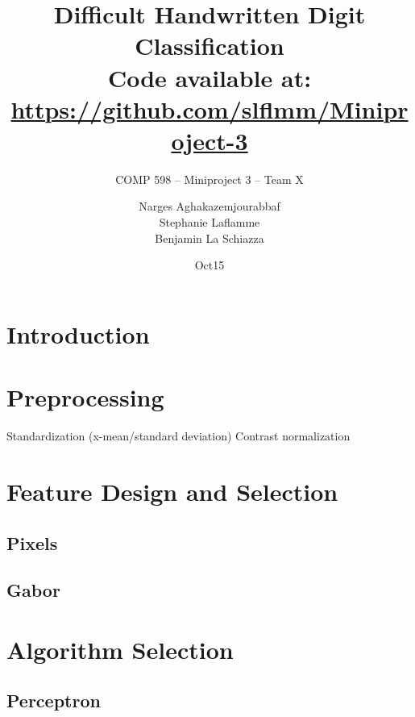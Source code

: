 \documentclass{acm_proc_article-sp}
\begin{document}
\title{Difficult Handwritten Digit Classification \\
{\normalsize Code available at: \url{https://github.com/slflmm/Miniproject-3}}} 
\subtitle{COMP 598 -- Miniproject 3 -- Team X}

\author{
\alignauthor 
Narges Aghakazemjourabbaf\\
\alignauthor
Stephanie Laflamme\\
\alignauthor Benjamin La Schiazza\\
}

\date{Oct15}



\maketitle
\begin{abstract}

\end{abstract}

\section{Introduction}%

\section{Preprocessing}
Standardization (x-mean/standard deviation)
Contrast normalization

\section{Feature Design and Selection}
\subsection{Pixels}
\subsection{Gabor}
\cite{Bau}

\section{Algorithm Selection}%
\subsection{Perceptron}
\end{document}
